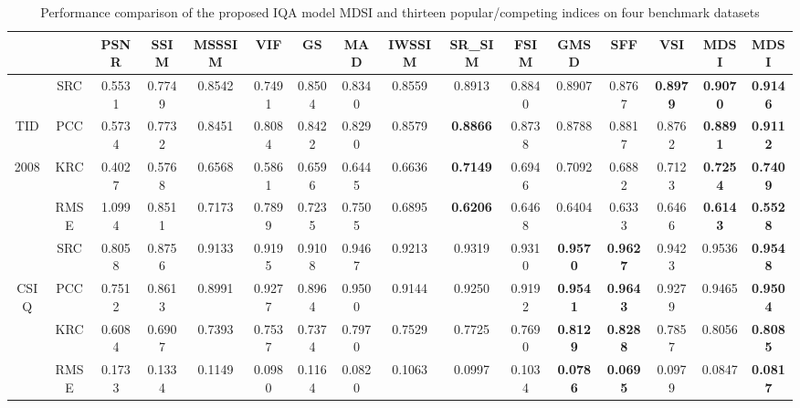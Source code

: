 \begin{table*}[htb]
\caption{Performance comparison of the proposed IQA model MDSI and thirteen popular/competing indices on four benchmark datasets}
\scriptsize
\centering
\begin{tabular}{cccccccccccccccc}
\hline
                      &      & PSNR   & SSIM   & MSSSIM & VIF    & GS     & MAD             & IWSSIM & SR\_SIM         & FSIM           & GMSD            & SFF             & VSI             & MDSI             & MDSI                \\ \hline
                      & SRC  & 0.5531 & 0.7749 & 0.8542 & 0.7491 & 0.8504 & 0.8340          & 0.8559 & 0.8913 & 0.8840          & 0.8907          & 0.8767          & \textbf{0.8979} & \textbf{0.9070} & \textbf{0.9146}\\
TID                   & PCC  & 0.5734 & 0.7732 & 0.8451 & 0.8084 & 0.8422 & 0.8290          & 0.8579 & \textbf{0.8866} & 0.8738          & 0.8788          & 0.8817 & 0.8762          & \textbf{0.8891} & \textbf{0.9112}\\
2008                  & KRC  & 0.4027 & 0.5768 & 0.6568 & 0.5861 & 0.6596 & 0.6445          & 0.6636 & \textbf{0.7149} & 0.6946          & 0.7092          & 0.6882          & 0.7123 & \textbf{0.7254} & \textbf{0.7409}\\
                      & RMSE & 1.0994 & 0.8511 & 0.7173 & 0.7899 & 0.7235 & 0.7505          & 0.6895 & \textbf{0.6206} & 0.6468          & 0.6404          & 0.6333 & 0.6466          & \textbf{0.6143} & \textbf{0.5528}\\ \hline
                      & SRC  & 0.8058 & 0.8756 & 0.9133 & 0.9195 & 0.9108 & 0.9467          & 0.9213 & 0.9319          & 0.9310          & \textbf{0.9570} & \textbf{0.9627} & 0.9423          & 0.9536 & \textbf{0.9548}\\
\multirow{2}{*}{CSIQ} & PCC  & 0.7512 & 0.8613 & 0.8991 & 0.9277 & 0.8964 & 0.9500 & 0.9144 & 0.9250          & 0.9192          & \textbf{0.9541} & \textbf{0.9643} & 0.9279          & 0.9465 & \textbf{0.9504}         \\
                      & KRC  & 0.6084 & 0.6907 & 0.7393 & 0.7537 & 0.7374 & 0.7970          & 0.7529 & 0.7725          & 0.7690          & \textbf{0.8129} & \textbf{0.8288} & 0.7857          & 0.8056 & \textbf{0.8085}\\
                      & RMSE & 0.1733 & 0.1334 & 0.1149 & 0.0980 & 0.1164 & 0.0820 & 0.1063 & 0.0997          & 0.1034          & \textbf{0.0786} & \textbf{0.0695} & 0.0979          & 0.0847 & \textbf{0.0817}         \\ \hline

\end{tabular}
\end{table*}
